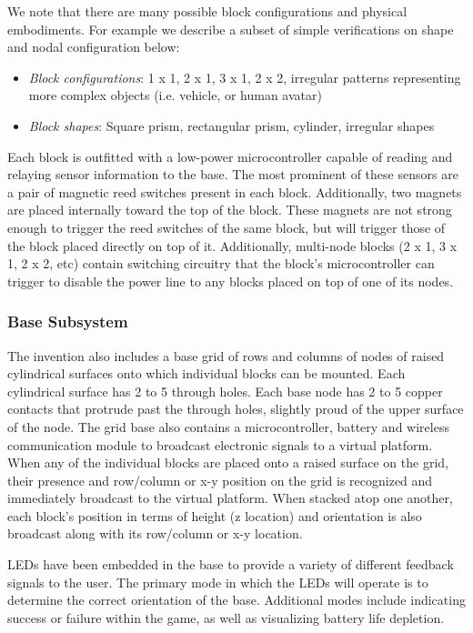 \documentclass[]{article}
\begin{document}
We note that there are many possible block configurations and physical embodiments. For example we describe a subset of simple verifications on shape and nodal configuration below:

\begin{itemize}
	\item \emph{Block configurations}: 1 x 1, 2 x 1, 3 x 1, 2 x 2, irregular patterns representing more complex objects (i.e. vehicle, or human avatar)
	\item \emph{Block shapes}: Square prism, rectangular prism, cylinder, irregular shapes
\end{itemize}

Each block is outfitted with a low-power microcontroller capable of reading and relaying sensor information to the base. The most prominent of these sensors are a pair of magnetic reed switches present in each block. Additionally, two magnets are placed internally toward the top of the block. These magnets are not strong enough to trigger the reed switches of the same block, but will trigger those of the block placed directly on top of it. Additionally, multi-node blocks (2 x 1, 3 x 1, 2 x 2, etc) contain switching circuitry that the block's microcontroller can trigger to disable the power line to any blocks placed on top of one of its nodes. 

\subsubsection{Base Subsystem}
The invention also includes a base grid of rows and columns of nodes of raised cylindrical surfaces onto which individual blocks can be mounted. Each cylindrical surface has 2 to 5 through holes. Each base node has 2 to 5 copper contacts that protrude past the through holes, slightly proud of  the upper surface of the node. The grid base also contains a microcontroller, battery and wireless communication module to broadcast electronic signals to a virtual platform. When any of the individual blocks are placed onto a raised surface on the grid, their presence and row/column or x-y position on the grid is recognized and immediately broadcast to the virtual platform. When stacked atop one another, each block’s position in terms of height (z location) and orientation is also broadcast along with its row/column or x-y location.

LEDs have been embedded in the base to provide a variety of different feedback signals to the user.  The primary mode in which the LEDs will operate is to determine the correct orientation of the base.  Additional modes include indicating success or failure within the game, as well as visualizing battery life depletion.
\end{document}

